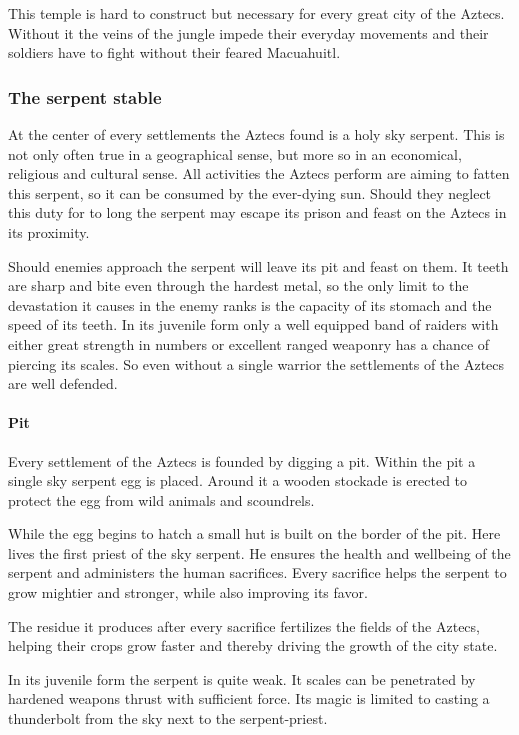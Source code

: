 This temple is hard to construct but necessary for every great city of the
\gls{Aztecs}. Without it the veins of the jungle impede their everyday
movements and their soldiers have to fight without their feared Macuahuitl.

\subsubsection{The serpent stable}
At the center of every settlements the \gls{Aztecs} found is a holy sky
serpent. This is not only often true in a geographical sense, but more so in an
economical, religious and cultural sense. All activities the \gls{Aztecs}
perform are aiming to fatten this serpent, so it can be consumed by the
ever-dying sun. Should they neglect this duty for to long the serpent may
escape its prison and feast on the \gls{Aztecs} in its proximity.

Should enemies approach the serpent will leave its pit and feast on them. It
teeth are sharp and bite even through the hardest metal, so the only limit to
the devastation it causes in the enemy ranks is the capacity of its stomach and
the speed of its teeth. In its juvenile form only a well equipped band of
raiders with either great strength in numbers or excellent ranged weaponry has
a chance of piercing its scales. So even without a single warrior the
settlements of the \gls{Aztecs} are well defended.

\paragraph{Pit}
Every settlement of the \gls{Aztecs} is founded by digging a pit. Within the
pit a single sky serpent egg is placed. Around it a wooden stockade is erected
to protect the egg from wild animals and scoundrels.

While the egg begins to hatch a small hut is built on the border of the pit.
Here lives the first priest of the sky serpent. He ensures the health and
wellbeing of the serpent and administers the human sacrifices. Every sacrifice
helps the serpent to grow mightier and stronger, while also improving its
favor.

The residue it produces after every sacrifice fertilizes the fields of the
\gls{Aztecs}, helping their crops grow faster and thereby driving the growth of
the city state.

In its juvenile form the serpent is quite weak. It scales can be penetrated by
hardened weapons thrust with sufficient force. Its magic is limited to casting
a thunderbolt from the sky next to the serpent-priest.

